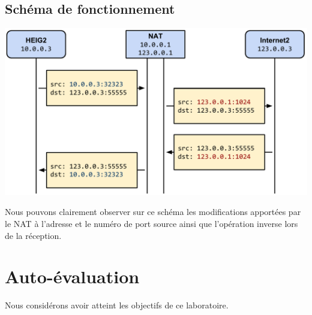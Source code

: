 \documentclass[11pt,a4paper]{article}
\begin{document}
\subsection{Schéma de fonctionnement}

\begin{center}
\includegraphics[width=14.5cm]{img_nat}
\end{center}

Nous pouvons clairement observer sur ce schéma les modifications apportées par le NAT à l'adresse et le numéro de port source ainsi que l'opération inverse lors de la réception.

\section{Auto-évaluation}

Nous considérons avoir atteint les objectifs de ce laboratoire.
\end{document}
